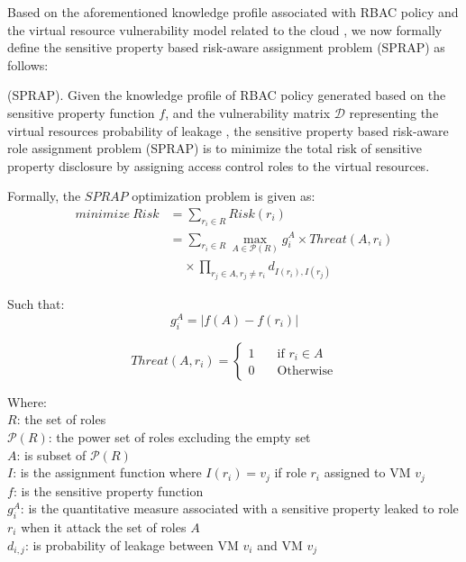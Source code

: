 \newtheorem{theorem}{Theorem}[section]
\newtheorem{proof}{Proof}[section]

Based on the aforementioned  knowledge profile associated with RBAC policy and the virtual resource vulnerability model related to the cloud \cite{almutairi2014risk}, we now formally define the sensitive property based risk-aware  assignment problem (SPRAP) as follows: 

\begin{definition}\label{def:SPRAP}
(SPRAP). Given the knowledge profile of RBAC policy generated  based on the sensitive property function $f$, and the vulnerability matrix  $\mathcal{D}$ representing the virtual resources probability of leakage \cite{almutairi2014risk},   the sensitive property based risk-aware role assignment problem (SPRAP) is to minimize the total risk of sensitive property  disclosure by assigning access control roles to the virtual resources.
\end{definition} 

Formally, the $SPRAP$ optimization problem is given as:
\begin{equation}\label{eq:cost}
\begin{split}
\textit{minimize} \ Risk &= \sum_{r_i \in R} Risk(r_i) \\
&= \sum_{r_i \in R} \max_{A \in \mathcal{P}(R)} g_i^{A}\times Threat(A,r_i) \\
& \ \ \ \ \ \times \prod_{r_j \in A,r_j \neq r_i} d_{I(r_i),I(r_j)} 
\end{split}
\end{equation}

Such that:\\
\begin{equation}
g^A_i=  |f(A)-f(r_i)|
\end{equation}

\begin{equation}
Threat(A,r_i) =
  \begin{cases}
    1 & \quad  \text{if $r_i \in A$}\\
        0 & \quad \text{Otherwise}
  \end{cases}
\end{equation}

Where: \\
$R$: the set of roles\\
$\mathcal{P}(R)$: the power set of roles excluding the empty set\\
$A$: is subset of $\mathcal{P}(R)$\\
$I$: is the assignment function where $I(r_i)=v_j$ if role $r_i$ assigned to VM $v_j$\\
$f$: is the sensitive property function \\
$g^A_i$: is the quantitative measure associated with a sensitive property leaked to role $r_i$ when it attack the set of roles $A$ \\
$d_{i,j}$: is probability of leakage between VM $v_i$ and  VM $v_j$ 

